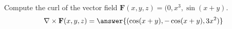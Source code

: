 \begin{problem}
Compute the curl of the vector field $\mathbf{F}(x,y,z) = (0,x^3,\sin(x+y)$.
\[
\nabla\times\mathbf{F}(x,y,z) = \answer{(\cos(x+y),-\cos(x+y),3x^2)}
\]
\end{problem}